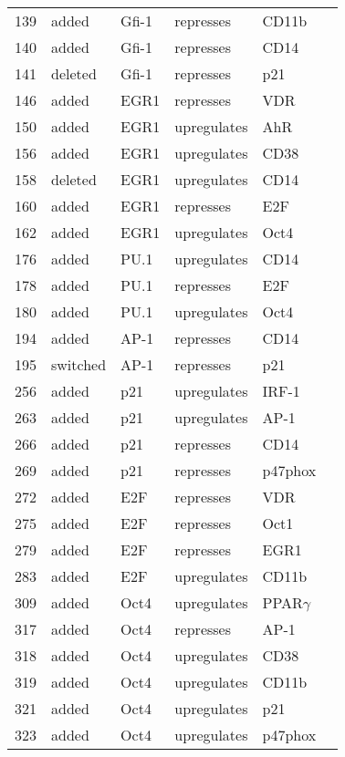 \begin{center}
\begin{scriptsize}
\begin{supertabular}{|p{2 cm}|p{2cm}|p{3cm}|p{2.5cm}|p{2cm}|p{1.5cm}|}
139 &  added &  Gfi-1  & represses &  CD11b & \\
140 &  added &  Gfi-1  & represses &  CD14 & \\
141 &  deleted &  Gfi-1  & represses &  p21 & \\
146 &  added &  EGR1  & represses &  VDR & \\
150 &  added &  EGR1  & upregulates &  AhR & \\
156 &  added &  EGR1  & upregulates &  CD38 & \\
158 &  deleted &  EGR1  & upregulates &  CD14 & \\
160 &  added &  EGR1  & represses &  E2F & \\
162 &  added &  EGR1  & upregulates &  Oct4 & \\
176 &  added &  PU.1  & upregulates &  CD14 & \\
178 &  added &  PU.1  & represses &  E2F & \\
180 &  added &  PU.1  & upregulates &  Oct4 & \\
194 &  added &  AP-1  & represses &  CD14 & \\
195 &  switched &  AP-1  & represses &  p21 & \\
256 &  added &  p21  & upregulates &  IRF-1 & \\
263 &  added &  p21  & upregulates &  AP-1 & \\
266 &  added &  p21  & represses &  CD14 & \\
269 &  added &  p21  & represses &  p47phox & \\
272 &  added &  E2F  & represses &  VDR & \\
275 &  added &  E2F  & represses &  Oct1 & \\
279 &  added &  E2F  & represses &  EGR1 & \\
283 &  added &  E2F  & upregulates &  CD11b & \\
309 &  added &  Oct4  & upregulates &  PPAR$\gamma$ & \\
317 &  added &  Oct4  & represses &  AP-1 & \\
318 &  added &  Oct4  & upregulates &  CD38 & \\
319 &  added &  Oct4  & upregulates &  CD11b & \\
321 &  added &  Oct4  & upregulates &  p21 & \\
323 &  added &  Oct4  & upregulates &  p47phox & \\

\hline
\end{supertabular}
\end{scriptsize}
\end{center}
%






